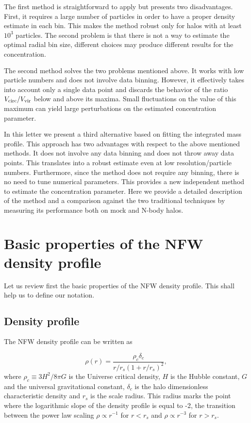 \documentclass[a4,useAMS,usenatbib,usegraphicx]{mn2e}
\begin{document}
The first method is straightforward to apply but presents two
disadvantages.  
First, it requires a large number of particles in
order to have a proper density estimate in each bin.  
This makes the method robust only for halos with at least $10^3$ particles.  
The second problem is that there is not a way to estimate the optimal
radial bin size, different choices may produce different results for the
concentration.

The second method solves the two problems mentioned above.  
It works with low particle numbers and does not involve data binning.  
However, it effectively takes into account only a single data point and
discards the behavior of the ratio $V_{\rm circ}/V_{\rm vir}$ below
and above its maxima.  
Small fluctuations on the value of this maximum can yield large
perturbations on the estimated concentration parameter.  

In this letter we present a third alternative based on fitting the
integrated mass profile.
This approach has two advantages with respect to the above mentioned
methods.  
It does not involve any data binning and does not throw away data
points. 
This translates into a robust estimate even at low resolution/particle
numbers.   
Furthermore, since the method does not require any binning, there is
no need to tune numerical parameters.
This provides a new independent method to estimate the concentration
parameter.   
Here we provide a detailed description of the method and a
comparison against the two traditional techniques by measuring its
performance both on mock and N-body halos.





\section{Basic properties of the NFW density profile}
\label{sec:basics}

Let us review first the basic properties of the NFW density profile.
This shall help us to define our notation.


\subsection{Density profile}

The NFW density profile can be written as

\begin{equation}
\rho(r) = \frac{\rho_c\delta_c}{r/r_s(1+r/r_s)^2},
\label{eq:definition}
\end{equation}
%
where $\rho_c\equiv 3H^2/8\pi G$ is the Universe critical density, $H$
is the Hubble constant, $G$ and the universal gravitational constant,
$\delta_c$ is the halo dimensionless characteristic density and $r_s$
is the scale radius. 
This radius marks the point where the logarithmic slope of the density
profile is equal to -2, the transition between the power law
scaling $\rho\propto r^{-1}$ for $r<r_s$ and $\rho\propto r^{-3}$ for
$r>r_s$. 
\end{document}
